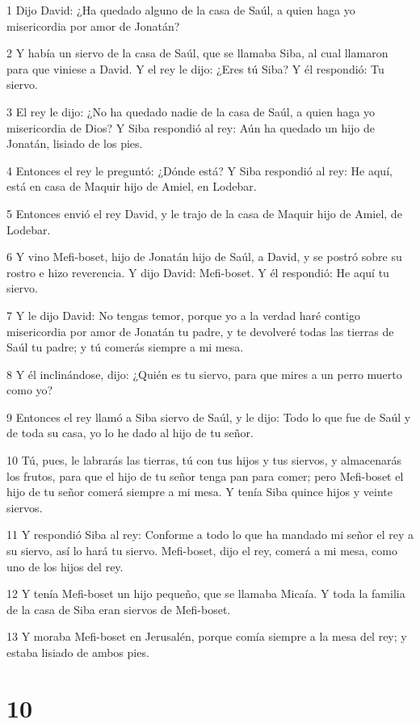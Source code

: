 \par 1 Dijo David: ¿Ha quedado alguno de la casa de Saúl, a quien haga yo misericordia por amor de Jonatán? 
\par 2 Y había un siervo de la casa de Saúl, que se llamaba Siba, al cual llamaron para que viniese a David. Y el rey le dijo: ¿Eres tú Siba? Y él respondió: Tu siervo.
\par 3 El rey le dijo: ¿No ha quedado nadie de la casa de Saúl, a quien haga yo misericordia de Dios? Y Siba respondió al rey: Aún ha quedado un hijo de Jonatán, lisiado de los pies.
\par 4 Entonces el rey le preguntó: ¿Dónde está? Y Siba respondió al rey: He aquí, está en casa de Maquir hijo de Amiel, en Lodebar.
\par 5 Entonces envió el rey David, y le trajo de la casa de Maquir hijo de Amiel, de Lodebar.
\par 6 Y vino Mefi-boset, hijo de Jonatán hijo de Saúl, a David, y se postró sobre su rostro e hizo reverencia. Y dijo David: Mefi-boset. Y él respondió: He aquí tu siervo.
\par 7 Y le dijo David: No tengas temor, porque yo a la verdad haré contigo misericordia por amor de Jonatán tu padre, y te devolveré todas las tierras de Saúl tu padre; y tú comerás siempre a mi mesa.
\par 8 Y él inclinándose, dijo: ¿Quién es tu siervo, para que mires a un perro muerto como yo?
\par 9 Entonces el rey llamó a Siba siervo de Saúl, y le dijo: Todo lo que fue de Saúl y de toda su casa, yo lo he dado al hijo de tu señor.
\par 10 Tú, pues, le labrarás las tierras, tú con tus hijos y tus siervos, y almacenarás los frutos, para que el hijo de tu señor tenga pan para comer; pero Mefi-boset el hijo de tu señor comerá siempre a mi mesa. Y tenía Siba quince hijos y veinte siervos.
\par 11 Y respondió Siba al rey: Conforme a todo lo que ha mandado mi señor el rey a su siervo, así lo hará tu siervo. Mefi-boset, dijo el rey, comerá a mi mesa, como uno de los hijos del rey.
\par 12 Y tenía Mefi-boset un hijo pequeño, que se llamaba Micaía. Y toda la familia de la casa de Siba eran siervos de Mefi-boset.
\par 13 Y moraba Mefi-boset en Jerusalén, porque comía siempre a la mesa del rey; y estaba lisiado de ambos pies.

\chapter{10}

